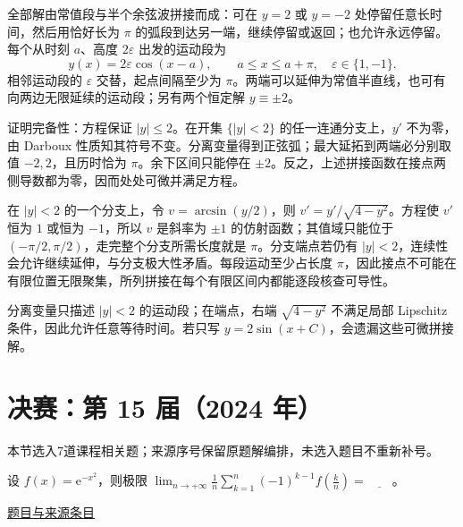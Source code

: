 \documentclass[UTF8,12pt,a4paper,fontset=fandol]{ctexart}
\begin{document}
\begin{solve}\label{ans:fin14-low:10}

全部解由常值段与半个余弦波拼接而成：可在 $y=2$ 或 $y=-2$ 处停留任意长时间，然后用恰好长为 $\pi$ 的弧段到达另一端，继续停留或返回；也允许永远停留。每个从时刻 $a$、高度 $2\varepsilon$ 出发的运动段为
\[
y(x)=2\varepsilon\cos(x-a),\qquad a\le x\le a+\pi,\quad\varepsilon\in\{1,-1\}.
\]
相邻运动段的 $\varepsilon$ 交替，起点间隔至少为 $\pi$。两端可以延伸为常值半直线，也可有向两边无限延续的运动段；另有两个恒定解 $y\equiv\pm2$。

证明完备性：方程保证 $|y|\le2$。在开集 $\{|y|<2\}$ 的任一连通分支上，$y'$ 不为零，由 Darboux 性质知其符号不变。分离变量得到正弦弧；最大延拓到两端必分别取值 $-2,2$，且历时恰为 $\pi$。余下区间只能停在 $\pm2$。反之，上述拼接函数在接点两侧导数都为零，因而处处可微并满足方程。

在 $|y|<2$ 的一个分支上，令 $v=\arcsin(y/2)$，则 $v'=y'/\sqrt{4-y^2}$。方程使 $v'$ 恒为 $1$ 或恒为 $-1$，所以 $v$ 是斜率为 $\pm1$ 的仿射函数；其值域只能位于 $(-\pi/2,\pi/2)$，走完整个分支所需长度就是 $\pi$。分支端点若仍有 $|y|<2$，连续性会允许继续延伸，与分支极大性矛盾。每段运动至少占长度 $\pi$，因此接点不可能在有限位置无限聚集，所列拼接在每个有限区间内都能逐段核查可导性。

\end{solve}

\begin{remark}[方法与条件]分离变量只描述 $|y|<2$ 的运动段；在端点，右端 $\sqrt{4-y^2}$ 不满足局部 Lipschitz 条件，因此允许任意等待时间。若只写 $y=2\sin(x+C)$，会遗漏这些可微拼接解。\end{remark}

\section{决赛：第 15 届（2024 年）}

本节选入7道课程相关题；来源序号保留原题解编排，未选入题目不重新补号。

\begin{example}[来源序号2]\label{ex:fin15-high:2}\label{pr:fin15-high:2}

设 $f(x) = \mathrm{e}^{-x^{2}}$，则极限
$\lim_{n\rightarrow+\infty}\frac{1}{n}\sum_{k=1}^{n}(-1)^{k-1}f\left(\frac{k}{n}\right) = \underline{\qquad}$。

\par\href{https://github.com/lzxcr/cmc-mathematics/blob/64916fa1fdbc3e444a652eca204d5669058ee321/src/problems/finals/15/02.md}{题目与来源条目}

\end{example}
\end{document}
